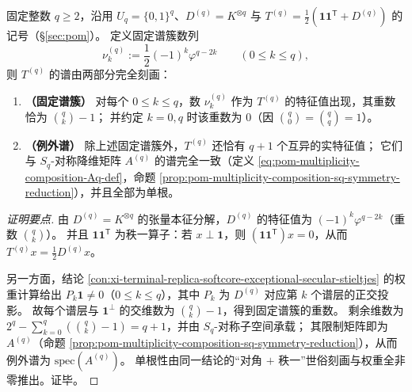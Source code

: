 \begin{conclusion}\label{con:xi-terminal-replica-softcore-fiber-splitting-full-spectrum}
固定整数 \(q\ge 2\)，沿用 \(U_q=\{0,1\}^q\)、\(D^{(q)}=K^{\otimes q}\) 与
\(
T^{(q)}=\frac12(\mathbf{1}\mathbf{1}^{\mathsf T}+D^{(q)})
\)
的记号（\S\ref{sec:pom}）。
定义固定谱簇数列
\[
\nu_k^{(q)}:=\frac12(-1)^k\varphi^{q-2k}\qquad(0\le k\le q),
\]
则 \(T^{(q)}\) 的谱由两部分完全刻画：
\begin{enumerate}
  \item \textbf{（固定谱簇）}
  对每个 \(0\le k\le q\)，数 \(\nu_k^{(q)}\) 作为 \(T^{(q)}\) 的特征值出现，其重数恰为 \(\binom{q}{k}-1\)；
  并约定 \(k=0,q\) 时该重数为 \(0\)（因 \(\binom{q}{0}=\binom{q}{q}=1\)）。
  \item \textbf{（例外谱）}
  除上述固定谱簇外，\(T^{(q)}\) 还恰有 \(q+1\) 个互异的实特征值；
  它们与 \(S_q\)-对称降维矩阵 \(A^{(q)}\) 的谱完全一致（定义 \eqref{eq:pom-multiplicity-composition-Aq-def}，命题 \ref{prop:pom-multiplicity-composition-sq-symmetry-reduction}），并且全部为单根。
\end{enumerate}
\end{conclusion}
\begin{proof}[证明要点]
由 \(D^{(q)}=K^{\otimes q}\) 的张量本征分解，\(D^{(q)}\) 的特征值为 \((-1)^k\varphi^{q-2k}\)（重数 \(\binom{q}{k}\)）。
并且 \(\mathbf{1}\mathbf{1}^{\mathsf T}\) 为秩一算子：若 \(x\perp\mathbf{1}\)，则 \((\mathbf{1}\mathbf{1}^{\mathsf T})x=0\)，从而 \(T^{(q)}x=\frac12D^{(q)}x\)。
\par
另一方面，结论 \ref{con:xi-terminal-replica-softcore-exceptional-secular-stieltjes} 的权重计算给出 \(P_k\mathbf{1}\neq 0\)（\(0\le k\le q\)），其中 \(P_k\) 为 \(D^{(q)}\) 对应第 \(k\) 个谱层的正交投影。
故每个谱层与 \(\mathbf{1}^\perp\) 的交维数为 \(\binom{q}{k}-1\)，得到固定谱簇的重数。
剩余维数为
\(
2^q-\sum_{k=0}^{q}(\binom{q}{k}-1)=q+1
\)，并由 \(S_q\)-对称子空间承载；
其限制矩阵即为 \(A^{(q)}\)（命题 \ref{prop:pom-multiplicity-composition-sq-symmetry-reduction}），从而例外谱为 \(\mathrm{spec}(A^{(q)})\)。
单根性由同一结论的“对角 \(+\) 秩一”世俗刻画与权重全非零推出。证毕。
\end{proof}

